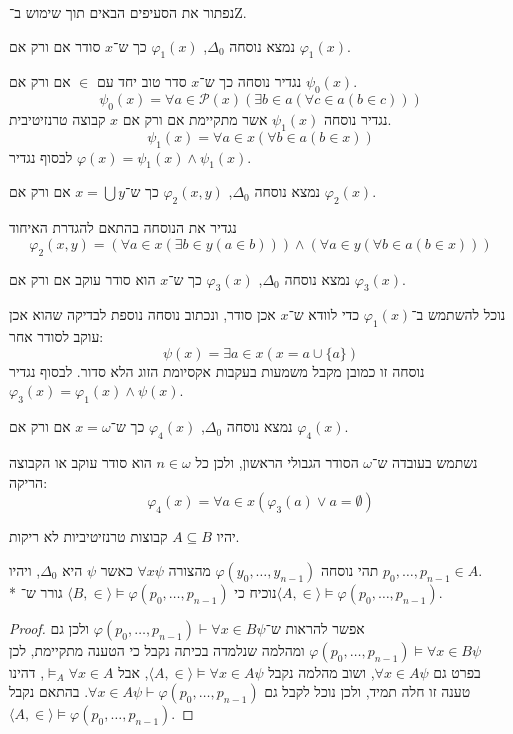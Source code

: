 \Question{}
נפתור את הסעיפים הבאים תוך שימוש ב־Z.

\Subquestion{}
נמצא נוסחה $\Delta_0$, $\varphi_1(x)$ כך ש־$x$ סודר אם ורק אם $\varphi_1(x)$.
\begin{solution}
	נגדיר נוסחה כך ש־$x$ סדר טוב יחד עם $\in$ אם ורק אם $\psi_0(x)$.
	\[
		\psi_0(x) = \forall a \in \mathcal{P}(x) (\exists b \in a (\forall c \in a (b \in c)))
	\]
	נגדיר נוסחה $\psi_1(x)$ אשר מתקיימת אם ורק אם $x$ קבוצה טרנזיטיבית.
	\[
		\psi_1(x) = \forall a \in x (\forall b \in a ( b \in x))
	\]
	לבסוף נגדיר $\varphi(x) = \psi_1(x) \land \psi_1(x)$.
\end{solution}

\Subquestion{}
נמצא נוסחה $\Delta_0$, $\varphi_2(x, y)$ כך ש־$x = \bigcup y$ אם ורק אם $\varphi_2(x)$.
\begin{solution}
	נגדיר את הנוסחה בהתאם להגדרת האיחוד
	\[
		\varphi_2(x, y) = (\forall a \in x (\exists b \in y (a \in b))) \land (\forall a \in y (\forall b \in a (b \in x)))
	\]
\end{solution}
נמצא נוסחה $\Delta_0$, $\varphi_3(x)$ כך ש־$x$ הוא סודר עוקב אם ורק אם $\varphi_3(x)$.
\begin{solution}
	נוכל להשתמש ב־$\varphi_1(x)$ כדי לוודא ש־$x$ אכן סודר, ונכתוב נוסחה נוספת לבדיקה שהוא אכן עוקב לסודר אחר:
	\[
		\psi(x) = \exists a \in x (x = a \cup \{ a \})
	\]
	נוסחה זו כמובן מקבל משמעות בעקבות אקסיומת הזוג הלא סדור.
	לבסוף נגדיר $\varphi_3(x) = \varphi_1(x) \land \psi(x)$.
\end{solution}

\Subquestion{}
נמצא נוסחה $\Delta_0$, $\varphi_4(x)$ כך ש־$x = \omega$ אם ורק אם $\varphi_4(x)$.
\begin{solution}
	נשתמש בעובדה ש־$\omega$ הסודר הגבולי הראשון, ולכן כל $n \in \omega$ הוא סודר עוקב או הקבוצה הריקה:
	\[
		\varphi_4(x) = \forall a \in x (\varphi_3(a) \lor a = \emptyset)
	\]
\end{solution}

\Question{}
יהיו $A \subseteq B$ קבוצות טרנזיטיביות לא ריקות.

\Subquestion{}
תהי נוסחה $\varphi(y_0, \dots, y_{n - 1})$ מהצורה $\forall x \psi$ כאשר $\psi$ היא $\Delta_0$, ויהיו $p_0, \dots, p_{n - 1} \in A$. \\*
נוכיח כי $\langle B, \in \rangle \models \varphi(p_0, \dots, p_{n - 1})$ גורר ש־$\langle A, \in \rangle \models \varphi(p_0, \dots, p_{n - 1})$.
\begin{proof}
	אפשר להראות ש־$\varphi(p_0, \dots, p_{n - 1}) \vdash \forall x \in B \psi$ ולכן גם $\varphi(p_0, \dots, p_{n - 1}) \models \forall x \in B \psi$ ומהלמה שנלמדה בכיתה נקבל כי הטענה מתקיימת, לכן בפרט גם $\forall x \in A \psi$,
	ושוב מהלמה נקבל $\langle A, \in \rangle \models \forall x \in A \psi$, אבל $\models_A \forall x \in A$, דהינו טענה זו חלה תמיד, ולכן נוכל לקבל גם $\forall x \in A \psi \vdash \varphi(p_0, \dots, p_{n - 1})$.
	בהתאם נקבל $\langle A, \in \rangle \models \varphi(p_0, \dots, p_{n - 1})$.
\end{proof}

